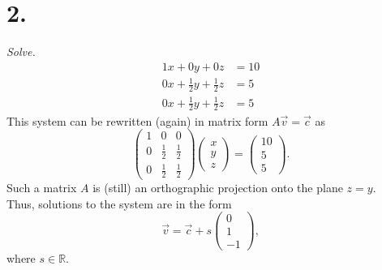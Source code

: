 \documentclass[12pt]{article}
\begin{document}
\section*{2.}
\textit{Solve.}
\begin{align*}
	1x + 0y + 0z &= 10 \\
	0x + \frac{1}{2}y + \frac{1}{2}z &= 5 \\
	0x + \frac{1}{2}y + \frac{1}{2}z &= 5
\end{align*}
This system can be rewritten (again) in matrix form $A\vec{v} = \vec{c}$ as
\begin{equation*}
	\begin{pmatrix}
		1 & 0 & 0 \\
		0 & \frac{1}{2} & \frac{1}{2} \\
		0 & \frac{1}{2} & \frac{1}{2}
	\end{pmatrix}
	\begin{pmatrix}
		x \\
		y \\
		z
	\end{pmatrix}
	=
	\begin{pmatrix}
		10 \\
		5 \\
		5
	\end{pmatrix}
	.
\end{equation*}
Such a matrix $A$ is (still) an orthographic projection onto the plane
$z = y$. \\
Thus, solutions to the system are in the form
\begin{equation*}
	\vec{v} =
	\boxed{
		\vec{c} + s \begin{pmatrix} 0 \\ 1 \\ -1 \end{pmatrix}
	}
	,
\end{equation*}
where $s \in \mathbb{R}$.
\end{document}
